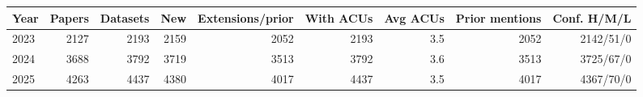 \begin{tabular}{lrrrrrrrr}
\toprule
Year & Papers & Datasets & New & Extensions/prior & With ACUs & Avg ACUs & Prior mentions & Conf. H/M/L \\
\midrule
2023 & 2127 & 2193 & 2159 & 2052 & 2193 & 3.5 & 2052 & 2142/51/0 \\
2024 & 3688 & 3792 & 3719 & 3513 & 3792 & 3.6 & 3513 & 3725/67/0 \\
2025 & 4263 & 4437 & 4380 & 4017 & 4437 & 3.5 & 4017 & 4367/70/0 \\
\bottomrule
\end{tabular}
